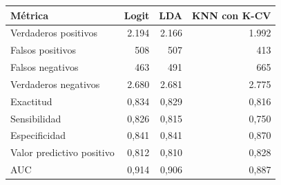 \begin{tabular}{lrrr}
\toprule
Métrica & Logit & LDA & KNN con K-CV \\
\midrule
Verdaderos positivos & 2.194 & 2.166 & 1.992 \\
Falsos positivos & 508 & 507 & 413 \\
Falsos negativos & 463 & 491 & 665 \\
Verdaderos negativos & 2.680 & 2.681 & 2.775 \\
\midrule
Exactitud & 0,834 & 0,829 & 0,816 \\
Sensibilidad & 0,826 & 0,815 & 0,750 \\
Especificidad & 0,841 & 0,841 & 0,870 \\
Valor predictivo positivo & 0,812 & 0,810 & 0,828 \\
AUC & 0,914 & 0,906 & 0,887 \\
\bottomrule
\end{tabular}